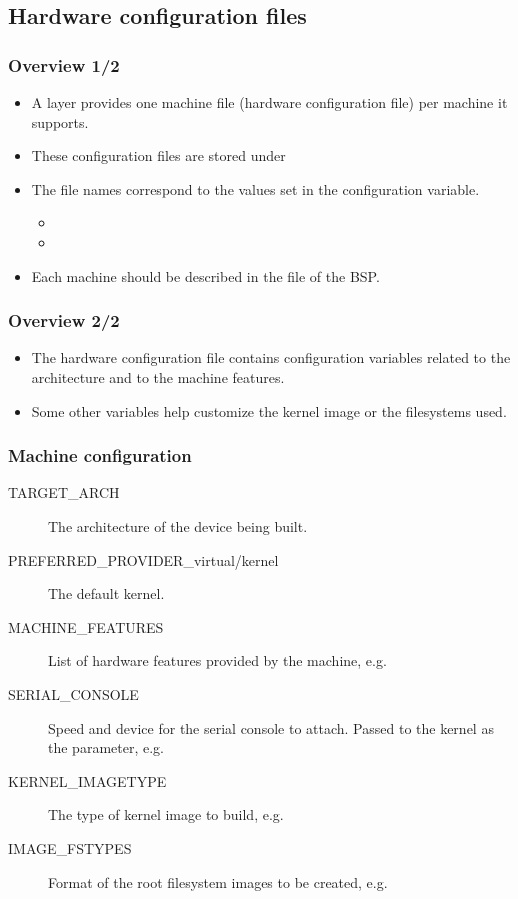 \subsection{Hardware configuration files}

\begin{frame}
  \frametitle{Overview 1/2}
  \begin{itemize}
    \item A layer provides one machine file (hardware configuration
      file) per machine it supports.
    \item These configuration files are stored under
    \item The file names correspond to the values set in the
       configuration variable.
      \begin{itemize}
        \item {}
        \item {}
      \end{itemize}
    \item Each machine should be described in the  file
      of the BSP.
  \end{itemize}
\end{frame}

\begin{frame}
  \frametitle{Overview 2/2}
  \begin{itemize}
    \item The hardware configuration file contains configuration
      variables related to the architecture and to the machine
      features.
    \item Some other variables help customize the kernel image or the
      filesystems used.
  \end{itemize}
\end{frame}

\begin{frame}
  \frametitle{Machine configuration}
  \begin{description}
    \item[TARGET\_ARCH] The architecture of the device being built.
    \item[PREFERRED\_PROVIDER\_virtual/kernel] The default kernel.
    \item[MACHINE\_FEATURES] List of hardware features provided by the
      machine, e.g. 
    \item[SERIAL\_CONSOLE] Speed and device for the serial console to
      attach. Passed to the kernel as the  parameter,
      e.g. 
    \item[KERNEL\_IMAGETYPE] The type of kernel image to build, e.g.
    \item[IMAGE\_FSTYPES] Format of the root filesystem images to be
    created, e.g. 
  \end{description}
\end{frame}

